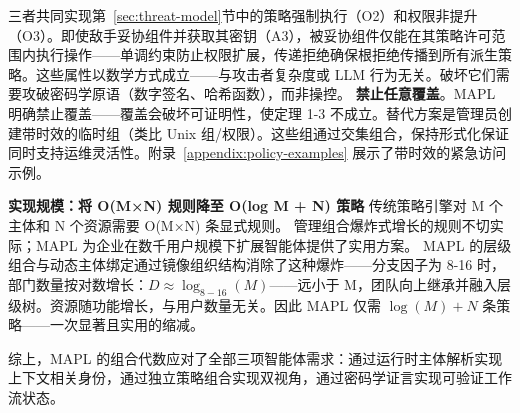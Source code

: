 三者共同实现第~\ref{sec:threat-model}节中的策略强制执行（O2）和权限非提升（O3）。即使敌手妥协组件并获取其密钥（A3），被妥协组件仅能在其策略许可范围内执行操作——单调约束防止权限扩展，传递拒绝确保根拒绝传播到所有派生策略。这些属性以数学方式成立——与攻击者复杂度或 LLM 行为无关。破坏它们需要攻破密码学原语（数字签名、哈希函数），而非操控。
\textbf{禁止任意覆盖}。MAPL 明确禁止覆盖——覆盖会破坏可证明性，使定理 1-3 不成立。替代方案是管理员创建带时效的临时组（类比 Unix 组/权限）。这些组通过交集组合，保持形式化保证同时支持运维灵活性。附录~\ref{appendix:policy-examples} 展示了带时效的紧急访问示例。

\noindent\textbf{实现规模：将 O(M×N) 规则降至 O(log M + N) 策略}
\label{sec:practical-policy}
传统策略引擎对 M 个主体和 N 个资源需要 O(M×N) 条显式规则。
管理组合爆炸式增长的规则不切实际；MAPL 为企业在数千用户规模下扩展智能体提供了实用方案。
MAPL 的层级组合与动态主体绑定通过镜像组织结构消除了这种爆炸——分支因子为 8-16 时，部门数量按对数增长：$D \approx \log_{8-16}(M)$——远小于 M，团队向上继承并融入层级树。资源随功能增长，与用户数量无关。因此 MAPL 仅需 $\log(M) + N$ 条策略——一次显著且实用的缩减。


综上，MAPL 的组合代数应对了全部三项智能体需求：通过运行时主体解析实现上下文相关身份，通过独立策略组合实现双视角，通过密码学证言实现可验证工作流状态。
